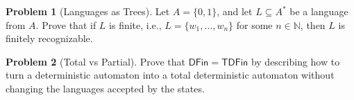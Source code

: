 \documentclass[11pt]{article}
\theoremstyle{theorem} %
\theoremstyle{definition} %
\newtheorem{problem}                    {{\color{BurntOrange}Problem}}
\theoremstyle{remark} %
\begin{document}
\begin{problem}
    [Languages as Trees]
    Let \(A = \{0, 1\}\), and let \(L \subseteq A^*\) be a language from \(A\). 
    Prove that if \(L\) is finite, i.e., \(L = \{w_1, \dots, w_n\}\) for some \(n \in \mathbb N\), then \(L\) is finitely recognizable.
\end{problem}

\begin{problem}
    [Total vs Partial]
    Prove that \(\mathsf{DFin} = \mathsf{TDFin}\) by describing how to turn a deterministic automaton into a total deterministic automaton without changing the languages accepted by the states.
\end{problem}
\end{document}
